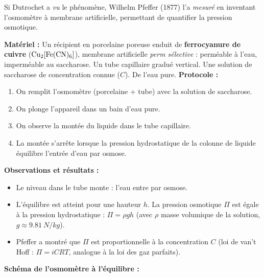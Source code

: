 \documentclass[11pt]{article}
\begin{document}
Si Dutrochet a \emph{vu} le phénomène, Wilhelm Pfeffer (1877) l'a \emph{mesuré} en inventant l'osmomètre à membrane artificielle, permettant de quantifier la pression osmotique.

\begin{experience}
\textbf{Matériel :} Un récipient en porcelaine poreuse enduit de \textbf{ferrocyanure de cuivre} ($\ce{Cu2[Fe(CN)6]}$), membrane artificielle \emph{perm sélective} : perméable à l'eau, imperméable au saccharose. Un tube capillaire gradué vertical. Une solution de saccharose de concentration connue ($C$). De l'eau pure.
\textbf{Protocole :}
\begin{enumerate}
    \item On remplit l'osmomètre (porcelaine + tube) avec la solution de saccharose.
    \item On plonge l'appareil dans un bain d'eau pure.
    \item On observe la montée du liquide dans le tube capillaire.
    \item La montée s'arrête lorsque la pression hydrostatique de la colonne de liquide équilibre l'entrée d'eau par osmose.
\end{enumerate}
\textbf{Observations et résultats :}
\begin{itemize}
    \item Le niveau dans le tube monte : l'eau entre par osmose.
    \item L'équilibre est atteint pour une hauteur $h$. La pression osmotique $\Pi$ est égale à la pression hydrostatique : $\Pi = \rho g h$ (avec $\rho$ masse volumique de la solution, $g \approx \SI{9,81}{N/kg}$).
    \item Pfeffer a montré que $\Pi$ est proportionnelle à la concentration $C$ (loi de van't Hoff : $\Pi = i C R T$, analogue à la loi des gaz parfaits).
\end{itemize}
\tcblower
\textbf{Schéma de l'osmomètre à l'équilibre :}
\begin{popfigure}
\end{popfigure}
\end{experience}
\end{document}
